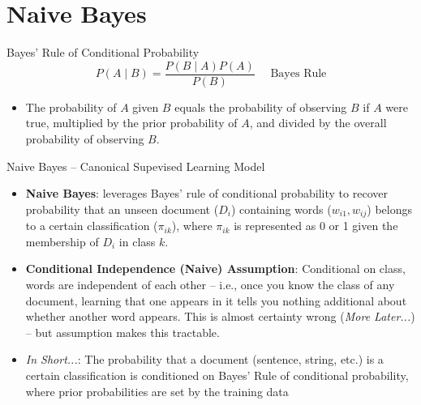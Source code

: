 \documentclass[
  ignorenonframetext,
  aspectratio=169]{beamer}
\begin{document}
\section{Naive Bayes}\label{naive-bayes}

\begin{frame}{Bayes' Rule of Conditional Probability}
\label{bayes-rule-of-conditional-probability}
\[P(A\mid B) = \frac{P(B\mid A) P(A)}{P(B)} \quad \text{ Bayes Rule}\]
\vspace{5mm}

\begin{itemize}
\item The probability of $A$ given $B$ equals the probability of observing $B$ if $A$ were true, multiplied by the prior probability of $A$, and divided by the overall probability of observing $B$. \vspace{2.5mm}
\end{itemize}
\end{frame}

\begin{frame}{Naive Bayes -- Canonical Supevised Learning Model}
\label{naive-bayes-canonical-supevised-learning-model}
\begin{itemize}
\item \textbf{Naive Bayes}: leverages Bayes' rule of conditional probability to recover probability that an unseen document ($D_{i}$) containing words ($w_{i1}, w_{ij}$) belongs to a certain classification ($\pi_{ik}$), where $\pi_{ik}$ is represented as 0 or 1 given the membership of $D_{i}$ in class $k$. \par \vspace{2.5mm} \pause
\item \textbf{Conditional Independence (Naive) Assumption}: Conditional on class, words are independent of each other – i.e., once you know the class of any document, learning that one appears in it tells you nothing additional about whether another word appears. This is almost certainty wrong (\textit{More Later...}) -- but assumption makes this tractable. \par \vspace{2.5mm} \pause 
\item \textit{In Short...}: The probability that a document (sentence, string, etc.) is a certain classification is conditioned on Bayes' Rule of conditional probability, where prior probabilities are set by the training data \par \vspace{2.5mm} \pause
\end{itemize}
\end{frame}
\end{document}
